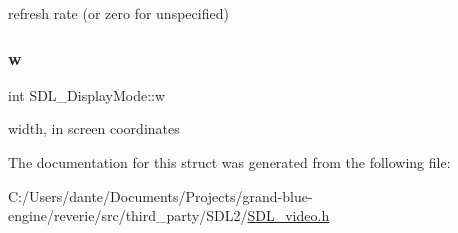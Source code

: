 refresh rate (or zero for unspecified) \mbox{\label{struct_s_d_l___display_mode_a504bb5e21950b719a0df43be51199046}} 
\subsubsection{\texorpdfstring{w}{w}}
{\footnotesize\ttfamily int S\+D\+L\+\_\+\+Display\+Mode\+::w}

width, in screen coordinates 

The documentation for this struct was generated from the following file\+:\begin{DoxyCompactItemize}
\item 
C\+:/\+Users/dante/\+Documents/\+Projects/grand-\/blue-\/engine/reverie/src/third\+\_\+party/\+S\+D\+L2/\mbox{\hyperlink{_s_d_l__video_8h}{S\+D\+L\+\_\+video.\+h}}\end{DoxyCompactItemize}
